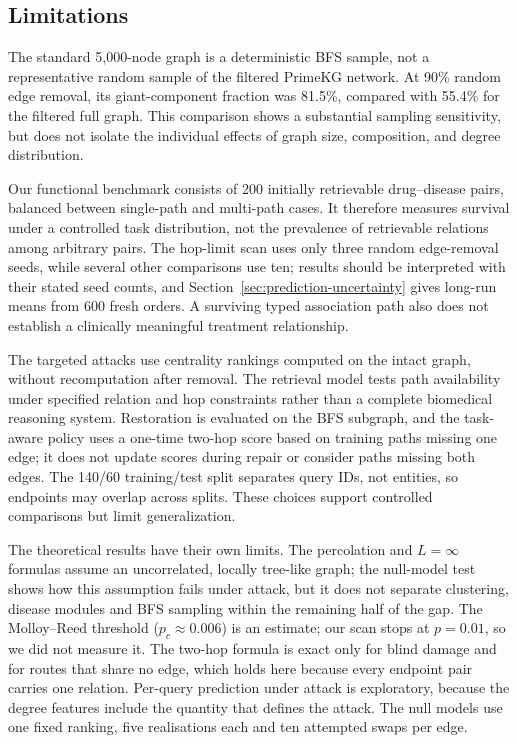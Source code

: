 \subsection{Limitations}
The standard 5,000-node graph is a deterministic BFS sample, not a representative random sample of the filtered PrimeKG network. At 90\% random edge removal, its giant-component fraction was 81.5\%, compared with 55.4\% for the filtered full graph. This comparison shows a substantial sampling sensitivity, but does not isolate the individual effects of graph size, composition, and degree distribution.

Our functional benchmark consists of 200 initially retrievable drug--disease pairs, balanced between single-path and multi-path cases. It therefore measures survival under a controlled task distribution, not the prevalence of retrievable relations among arbitrary pairs. The hop-limit scan uses only three random edge-removal seeds, while several other comparisons use ten; results should be interpreted with their stated seed counts, and Section~\ref{sec:prediction-uncertainty} gives long-run means from 600 fresh orders. A surviving typed association path also does not establish a clinically meaningful treatment relationship.

The targeted attacks use centrality rankings computed on the intact graph, without recomputation after removal. The retrieval model tests path availability under specified relation and hop constraints rather than a complete biomedical reasoning system. Restoration is evaluated on the BFS subgraph, and the task-aware policy uses a one-time two-hop score based on training paths missing one edge; it does not update scores during repair or consider paths missing both edges. The 140/60 training/test split separates query IDs, not entities, so endpoints may overlap across splits. These choices support controlled comparisons but limit generalization.

The theoretical results have their own limits. The percolation and $L=\infty$
formulas assume an uncorrelated, locally tree-like graph; the null-model test
shows how this assumption fails under attack, but it does not separate
clustering, disease modules and BFS sampling within the remaining half of the
gap. The Molloy--Reed threshold ($p_c\approx0.006$) is an estimate; our scan
stops at $p=0.01$, so we did not measure it. The two-hop formula is exact only
for blind damage and for routes that share no edge, which holds here because
every endpoint pair carries one relation. Per-query prediction under attack is
exploratory, because the degree features include the quantity that defines the
attack. The null models use one fixed ranking, five realisations each and ten
attempted swaps per edge.

